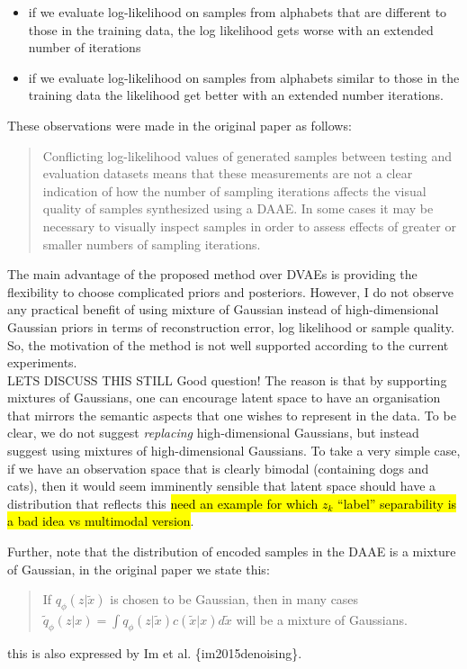 \documentclass{article}
\begin{document}
\begin{itemize}
    \item if we evaluate log-likelihood on samples from alphabets that are different to those in the training data, the log likelihood gets worse with an extended number of iterations
    \item if we evaluate log-likelihood on samples from alphabets similar to those in the training data the likelihood get better with an extended number iterations.
\end{itemize}

{\color{red} 
These observations were made in the original paper as follows:
 \begin{quote}
 Conflicting log-likelihood values of generated samples between testing and evaluation datasets means that these measurements are not a clear indication of how the number of sampling iterations affects the visual quality of samples synthesized using a DAAE. In some cases it may be necessary to visually inspect samples in order to assess effects of greater or smaller numbers of sampling iterations. 
 \end{quote}
}


{\color{blue}
The main advantage of the proposed method over DVAEs is providing the flexibility to choose complicated priors and posteriors. However, I do not observe any practical benefit of using mixture of Gaussian instead of high-dimensional Gaussian priors in terms of reconstruction error, log likelihood or sample quality. So, the motivation of the method is not well supported according to the current experiments.}\\


{\color{red} LETS DISCUSS THIS STILL}
Good question!  The reason is that by supporting mixtures of Gaussians, one can encourage latent space to have an organisation that mirrors the semantic aspects that one wishes to represent in the data. To be clear, we do not suggest {\em replacing} high-dimensional Gaussians, but instead suggest using mixtures of high-dimensional Gaussians.   To take a very simple case, if we have an observation space that is clearly bimodal (containing dogs and cats), then it would seem imminently sensible that latent space should have a distribution that reflects this \hl{need an example for which $z_k$ ``label'' separability is a bad idea vs multimodal version}.\\

{\color{red} 
Further, note that the distribution of encoded samples in the DAAE is a mixture of Gaussian, in the original paper we state this:

\begin{quote}
If $q_\phi(z|\tilde{x})$ is chosen to be Gaussian, then in many cases $\tilde{q}_\phi(z|x) = \int q_\phi(z|\tilde{x})c(\tilde{x}|x)d \tilde{x}$ will be a mixture of Gaussians.
\end{quote}
this is also expressed by Im et al. \{im2015denoising\}.
}
\end{document}
